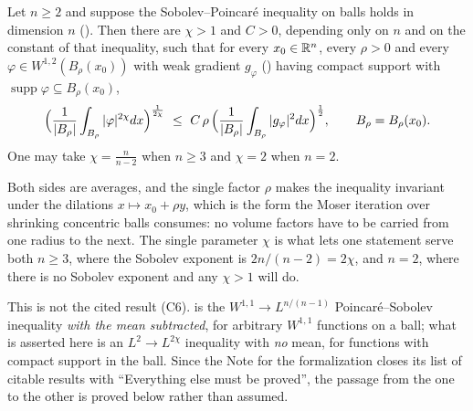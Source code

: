 \begin{lemma}
Let $n\ge2$ and suppose the Sobolev--Poincar\'e inequality on balls holds in
dimension $n$ ().  Then there are
$\chi>1$ and $C>0$, depending only on $n$ and on the constant of that
inequality, such that for every $x_0\in\mathbb{R}^n$, every $\rho>0$ and every
$\varphi\in W^{1,2}(B_\rho(x_0))$ with weak gradient $g_\varphi$
() having compact support with
$\operatorname{supp}\varphi\subseteq B_\rho(x_0)$,
\[
\Bigl(\frac1{|B_\rho|}\int_{B_\rho}|\varphi|^{2\chi}dx\Bigr)^{\frac1{2\chi}}
\ \le\ C\,\rho\,
\Bigl(\frac1{|B_\rho|}\int_{B_\rho}|g_\varphi|^{2}dx\Bigr)^{\frac12},
\qquad B_\rho=B_\rho(x_0).
\]
One may take $\chi=\frac n{n-2}$ when $n\ge3$ and $\chi=2$ when $n=2$.

Both sides are averages, and the single factor $\rho$ makes the inequality
invariant under the dilations $x\mapsto x_0+\rho y$, which is the form the
Moser iteration over shrinking concentric balls consumes: no volume factors
have to be carried from one radius to the next.  The single parameter $\chi$ is
what lets one statement serve both $n\ge3$, where the Sobolev exponent is
$2n/(n-2)=2\chi$, and $n=2$, where there is no Sobolev exponent and any
$\chi>1$ will do.

This is not the cited result (C6).   is the
$W^{1,1}\to L^{n/(n-1)}$ Poincar\'e--Sobolev inequality \emph{with the mean
subtracted}, for arbitrary $W^{1,1}$ functions on a ball; what is asserted here
is an $L^2\to L^{2\chi}$ inequality with \emph{no} mean, for functions with
compact support in the ball.  Since the Note for the formalization closes its
list of citable results with ``Everything else must be proved'', the passage
from the one to the other is proved below rather than assumed.
\end{lemma}
